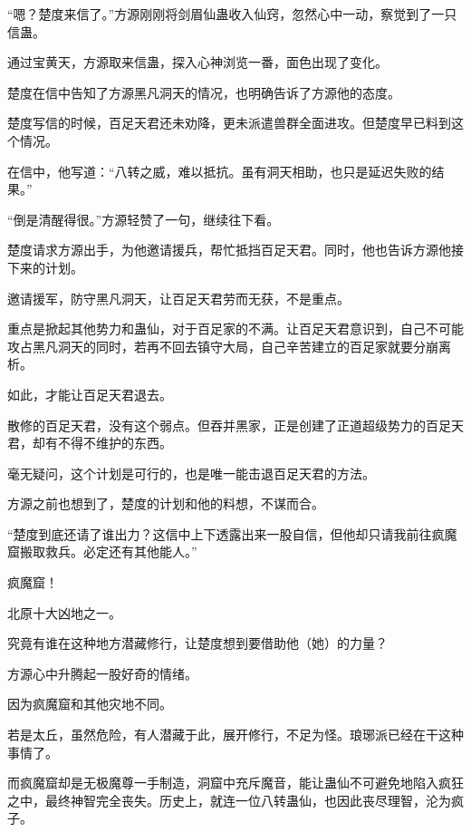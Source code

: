 \begin{this_body}
“嗯？楚度来信了。”方源刚刚将剑眉仙蛊收入仙窍，忽然心中一动，察觉到了一只信蛊。

通过宝黄天，方源取来信蛊，探入心神浏览一番，面色出现了变化。

楚度在信中告知了方源黑凡洞天的情况，也明确告诉了方源他的态度。

楚度写信的时候，百足天君还未劝降，更未派遣兽群全面进攻。但楚度早已料到这个情况。

在信中，他写道：“八转之威，难以抵抗。虽有洞天相助，也只是延迟失败的结果。”

“倒是清醒得很。”方源轻赞了一句，继续往下看。

楚度请求方源出手，为他邀请援兵，帮忙抵挡百足天君。同时，他也告诉方源他接下来的计划。

邀请援军，防守黑凡洞天，让百足天君劳而无获，不是重点。

重点是掀起其他势力和蛊仙，对于百足家的不满。让百足天君意识到，自己不可能攻占黑凡洞天的同时，若再不回去镇守大局，自己辛苦建立的百足家就要分崩离析。

如此，才能让百足天君退去。

散修的百足天君，没有这个弱点。但吞并黑家，正是创建了正道超级势力的百足天君，却有不得不维护的东西。

毫无疑问，这个计划是可行的，也是唯一能击退百足天君的方法。

方源之前也想到了，楚度的计划和他的料想，不谋而合。

“楚度到底还请了谁出力？这信中上下透露出来一股自信，但他却只请我前往疯魔窟搬取救兵。必定还有其他能人。”

疯魔窟！

北原十大凶地之一。

究竟有谁在这种地方潜藏修行，让楚度想到要借助他（她）的力量？

方源心中升腾起一股好奇的情绪。

因为疯魔窟和其他灾地不同。

若是太丘，虽然危险，有人潜藏于此，展开修行，不足为怪。琅琊派已经在干这种事情了。

而疯魔窟却是无极魔尊一手制造，洞窟中充斥魔音，能让蛊仙不可避免地陷入疯狂之中，最终神智完全丧失。历史上，就连一位八转蛊仙，也因此丧尽理智，沦为疯子。

\end{this_body}

